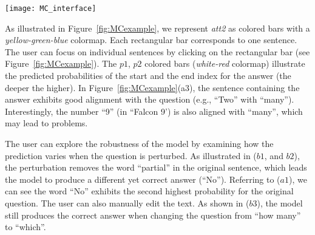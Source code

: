 \begin{figure*}[t]
\centering
\vspace{-2mm}
 \texttt{[image: MC\_interface]}
  \vspace{-7mm}
 \caption{
In the machine comprehension visualization interface (a), the $p1$, $p2$ colored bar (in $a3$) illustrates the predicted start and end index of the answer in the context (the deeper the red, the higher the probability). The most likely answer is shown in ($a1$). The global attention and local attention are visualized by ($a2$, $a3$).
%
We can evaluate the robustness of the prediction by perturbing the question sentence ($b1$, $b3$). As illustrated in ($b1$, $b2$), by removing the word ``partial'', the model still finds the correct answer (albeit different, as the sentence perturbation changes the exact meaning of the question). 
}
\label{fig:MCexample}
\end{figure*}

As illustrated in Figure~\ref{fig:MCexample}, we represent \emph{att2} as colored bars with a \emph{yellow-green-blue} colormap. Each rectangular bar corresponds to one sentence. The user can focus on individual sentences by clicking on the rectangular bar (see Figure~\ref{fig:MCexample}).
The $p1$, $p2$ colored bars (\emph{white-red} colormap) illustrate the predicted probabilities of the start and the end index for the answer (the deeper the higher). %
%
In Figure~\ref{fig:MCexample}(a3), the sentence containing the answer exhibits good alignment with the question (e.g., ``Two'' with ``many'').
Interestingly, the number ``9'' (in ``Falcon 9') is also aligned with ``many'', which may lead to problems.

The user can explore the robustness of the model by examining how the prediction varies when the question is perturbed.
%
As illustrated in ($b1$, and $b2$), the perturbation removes the word ``partial'' in the original sentence, which leads the model to produce a different yet correct answer (``No''). Referring to ($a1$), we can see the word ``No'' exhibits the second highest probability for the original question.
%
The user can also manually edit the text. As shown in ($b3$), the model still produces the correct answer when changing the question from ``how many'' to ``which''.

